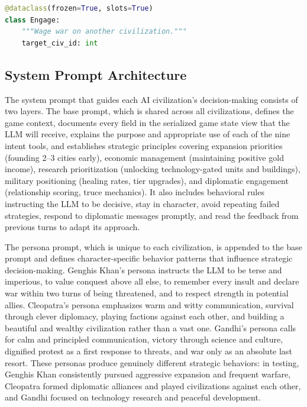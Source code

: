 \documentclass[conference]{IEEEtran}
\begin{document}
\begin{lstlisting}[language=Python]
@dataclass(frozen=True, slots=True)
class Engage:
    """Wage war on another civilization."""
    target_civ_id: int
\end{lstlisting}

\subsection{System Prompt Architecture}

The system prompt that guides each AI civilization's decision-making consists of two layers. The base prompt, which is shared across all civilizations, defines the game context, documents every field in the serialized game state view that the LLM will receive, explains the purpose and appropriate use of each of the nine intent tools, and establishes strategic principles covering expansion priorities (founding 2--3 cities early), economic management (maintaining positive gold income), research prioritization (unlocking technology-gated units and buildings), military positioning (healing rates, tier upgrades), and diplomatic engagement (relationship scoring, truce mechanics). It also includes behavioral rules instructing the LLM to be decisive, stay in character, avoid repeating failed strategies, respond to diplomatic messages promptly, and read the feedback from previous turns to adapt its approach.

The persona prompt, which is unique to each civilization, is appended to the base prompt and defines character-specific behavior patterns that influence strategic decision-making. Genghis Khan's persona instructs the LLM to be terse and imperious, to value conquest above all else, to remember every insult and declare war within two turns of being threatened, and to respect strength in potential allies. Cleopatra's persona emphasizes warm and witty communication, survival through clever diplomacy, playing factions against each other, and building a beautiful and wealthy civilization rather than a vast one. Gandhi's persona calls for calm and principled communication, victory through science and culture, dignified protest as a first response to threats, and war only as an absolute last resort. These personas produce genuinely different strategic behaviors: in testing, Genghis Khan consistently pursued aggressive expansion and frequent warfare, Cleopatra formed diplomatic alliances and played civilizations against each other, and Gandhi focused on technology research and peaceful development.
\end{document}
